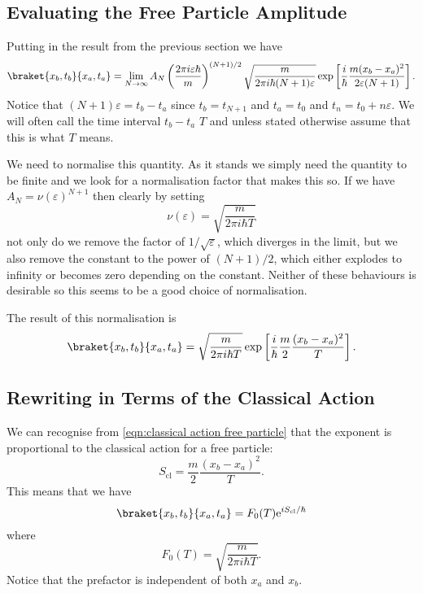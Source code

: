 \documentclass[fleqn]{NotesClass}
\newcommand*{\e}{\mathrm{e}}
\newcommand*{\cl}{\mathrm{cl}}
\begin{document}
    \subsection{Evaluating the Free Particle Amplitude}
    Putting in the result from the previous section we have
    \begin{equation*}
        \braket{x_b, t_b}{x_a, t_a} = \lim_{N\to\infty} A_N \left( \frac{2\pi i \varepsilon \hbar}{m} \right)^{(N+1)/2} \sqrt{\frac{m}{2\pi i \hbar(N + 1)\varepsilon}} \exp\left[ \frac{i}{\hbar} \frac{m(x_b - x_a)^2}{2\varepsilon(N + 1)} \right].
    \end{equation*}
    Notice that \((N + 1)\varepsilon = t_b - t_a\) since \(t_b = t_{N+1}\) and \(t_a = t_0\) and \(t_n = t_0 + n\varepsilon\).
    We will often call the time interval \(t_b - t_a\) \(T\) and unless stated otherwise assume that this is what \(T\) means.
    
    We need to normalise this quantity.
    As it stands we simply need the quantity to be finite and we look for a normalisation factor that makes this so.
    If we have \(A_N = \nu(\varepsilon)^{N + 1}\) then clearly by setting
    \begin{equation}
        \nu(\varepsilon) = \sqrt{\frac{m}{2\pi i\hbar T}}
    \end{equation}
    not only do we remove the factor of \(1/\sqrt{\varepsilon}\), which diverges in the limit, but we also remove the constant to the power of \((N + 1)/2\), which either explodes to infinity or becomes zero depending on the constant.
    Neither of these behaviours is desirable so this seems to be a good choice of normalisation.
    
    The result of this normalisation is
    \begin{equation}
        \braket{x_b, t_b}{x_a, t_a} = \sqrt{\frac{m}{2\pi i\hbar T}} \exp\left[ \frac{i}{\hbar} \frac{m}{2}\frac{(x_b - x_a)^2}{T} \right].
    \end{equation}

    \subsection{Rewriting in Terms of the Classical Action}
    We can recognise from \cref{eqn:classical action free particle} that the exponent is proportional to the classical action for a free particle:
    \begin{equation}
        S_{\cl} = \frac{m}{2}\frac{(x_b - x_a)^2}{T}.
    \end{equation}
    This means that we have
    \begin{equation}
        \braket{x_b, t_b}{x_a, t_a} = F_0(T) \e^{i S_{\cl}/\hbar}
    \end{equation}
    where
    \begin{equation}
        F_0(T) = \sqrt{\frac{m}{2\pi i\hbar T}}.
    \end{equation}
    Notice that the prefactor is independent of both \(x_a\) and \(x_b\).
    
\end{document}

